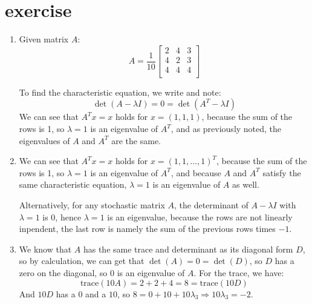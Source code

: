 \documentclass{article}
\begin{document}
\section{exercise}
\begin{enumerate}[label=\alph*)]

    \item Given matrix \(A\):
          \[
              A = \frac{1}{10} \begin{bmatrix}
                  2 & 4 & 3 \\
                  4 & 2 & 3 \\
                  4 & 4 & 4 \\
              \end{bmatrix}
          \]

          To find the characteristic equation, we write and note:
          \[
              \det(A - \lambda I) = 0 = \det(A^T - \lambda I)
          \]
          We can see that $A^T x = x$ holds for $x = (1, 1, 1)$, because the sum of the rows is 1,
          so $\lambda = 1$ is an eigenvalue of $A^T$, and as previously noted,
          the eigenvalues of $A$ and $A^T$ are the same.

    \item

          We can see that $A^T x = x$ holds for $x = (1, 1, \ldots, 1)^T$,
          because the sum of the rows is 1,
          so $\lambda = 1$ is an eigenvalue of $A^T$,
          and because $A$ and $A^T$ satisfy the same characteristic equation,
          $\lambda = 1$ is an eigenvalue of $A$ as well.

          Alternatively, for any stochastic matrix $A$, the determinant of $A-\lambda I$ with $\lambda=1$ is 0,
          hence $\lambda=1$ is an eigenvalue, because the rows are not linearly inpendent,
          the last row is namely the sum of the previous rows times $-1$.

    \item We know that $A$ has the same trace and determinant as its diagonal form $D$,
          so by calculation, we can get that $\det(A) = 0 = \det(D)$, so $D$ has a zero on the diagonal,
          so $0$ is an eigenvalue of $A$. For the trace, we have:
          \[
              \text{trace}(10A) = 2 + 2 + 4 = 8 = \text{trace}(10D)
          \]
          And $10D$ has a $0$ and a $10$, so $8=0+10+10\lambda_3 \Rightarrow 10\lambda_3 = -2$.


\end{enumerate}
\end{document}
